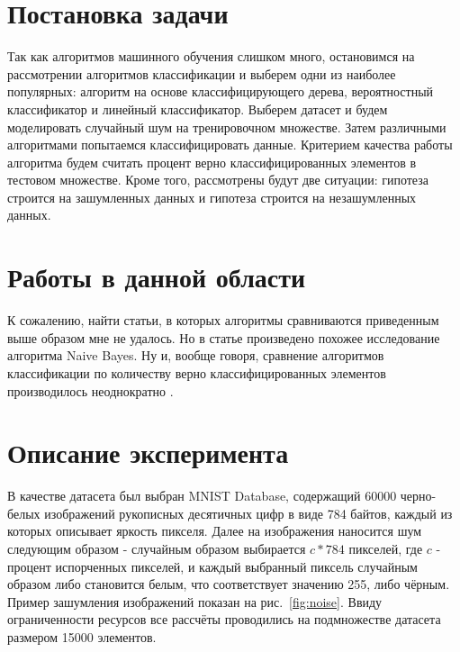 \documentclass{article}
\begin{document}
\section{Постановка задачи}
Так как алгоритмов машинного обучения слишком много, остановимся на рассмотрении алгоритмов классификации и выберем одни из наиболее популярных:
алгоритм на основе классифицирующего дерева, вероятностный классификатор и линейный классификатор. Выберем датасет и будем моделировать случайный шум на тренировочном множестве. Затем различными алгоритмами попытаемся классифицировать данные. Критерием качества работы алгоритма будем считать процент верно классифицированных элементов в тестовом множестве. Кроме того, рассмотрены будут две ситуации: гипотеза строится на зашумленных данных и гипотеза строится на незашумленных данных.



\section{Работы в данной области}
К сожалению, найти статьи, в которых алгоритмы сравниваются приведенным выше образом мне не удалось. Но в статье \cite{glick2004enrichment} произведено похожее исследование алгоритма Naive Bayes. Ну и, вообще говоря, сравнение алгоритмов классификации по количеству верно классифицированных элементов производилось неоднократно \cite{Lorena20115268}\cite{Brown20123446}.


\section{Описание эксперимента}
В качестве датасета был выбран MNIST Database, содержащий 60000 черно-белых изображений рукописных десятичных цифр в виде 784 байтов, каждый из которых описывает яркость пикселя. Далее на изображения наносится шум следующим образом - случайным образом выбирается $c * 784$ пикселей, где $c$ - процент испорченных пикселей, и каждый выбранный пиксель случайным образом либо становится белым, что соответствует значению 255, либо чёрным. Пример зашумления изображений показан на рис.~\ref{fig:noise}. Ввиду ограниченности ресурсов все рассчёты проводились на подмножестве датасета размером 15000 элементов.
\end{document}
